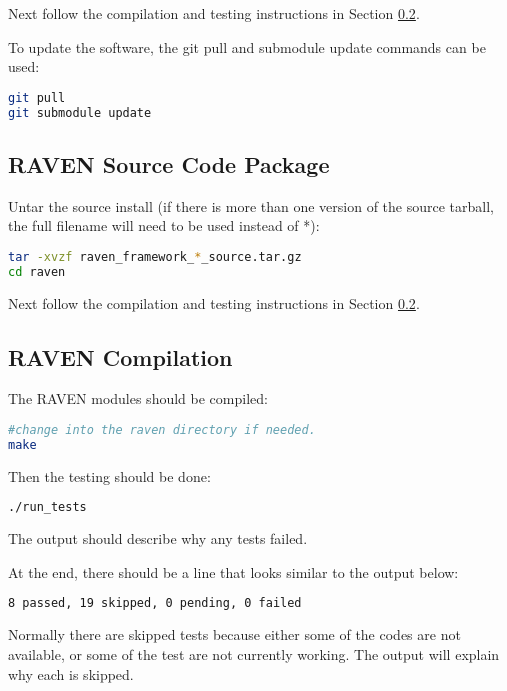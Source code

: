 Next follow the compilation and testing instructions in Section \ref{raven_compilation}.

To update the software, the git pull and submodule update commands can
be used:

\begin{lstlisting}[language=bash]
git pull
git submodule update
\end{lstlisting}


\subsection{RAVEN Source Code Package}
\label{raven_source_package}

Untar the source install (if there is more than one version of the
source tarball, the full filename will need to be used instead of *):

\begin{lstlisting}[language=bash]
tar -xvzf raven_framework_*_source.tar.gz
cd raven
\end{lstlisting}

Next follow the compilation and testing instructions in Section
\ref{raven_compilation}.

\subsection{RAVEN Compilation}
\label{raven_compilation}

The RAVEN modules should be compiled:

\begin{lstlisting}[language=bash]
#change into the raven directory if needed.
make
\end{lstlisting}

Then the testing should be done:

\begin{lstlisting}[language=bash]
./run_tests
\end{lstlisting}

The output should describe why any tests failed.

At the end, there should be a line that looks similar to the output below:
\begin{lstlisting}[language=bash]
8 passed, 19 skipped, 0 pending, 0 failed
\end{lstlisting}

Normally there are skipped tests because either some of the codes are
not available, or some of the test are not currently working.  The
output will explain why each is skipped.

